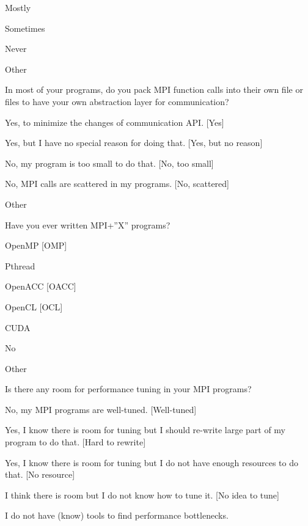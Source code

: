 \documentclass[preprint,5p,times]{elsarticle}
\begin{document}
{{\begin{description}
\begin{inparaenum}[{\bf C}1)]
    \item Mostly
    \item Sometimes
    \item Never
    \item Other
    \end{inparaenum}
  \item[Q21:] In most of your programs, do you pack MPI function calls into their own file or files to have your own abstraction layer for communication?
    \begin{inparaenum}[{\bf C}1)]
    \item Yes, to minimize the changes of communication API. [Yes]
    \item Yes, but I have no special reason for doing that. [Yes, but no reason]
    \item No, my program is too small to do that. [No, too small]
    \item No, MPI calls are scattered in my programs. [No, scattered]
    \item Other
    \end{inparaenum}
  \item[Q22*:] Have you ever written MPI+”X” programs?
    \begin{inparaenum}[{\bf C}1)]
    \item OpenMP [OMP]
    \item Pthread
    \item OpenACC [OACC]
    \item OpenCL [OCL]
    \item CUDA
    \item No
    \item Other
    \end{inparaenum}
  \item[Q23:] Is there any room for performance tuning in your MPI programs?
    \begin{inparaenum}[{\bf C}1)]
    \item No, my MPI programs are well-tuned. [Well-tuned]
    \item Yes, I know there is room for tuning but I should re-write large
      part of my program to do that. [Hard to rewrite]
    \item Yes, I know there is room for tuning but I do not have enough resources to do that.
      [No resource]
    \item I think there is room but I do not know how to tune it.
      [No idea to tune]
    \item I do not have (know) tools to find performance bottlenecks.

\end{inparaenum}
\end{description}}}
\end{document}
